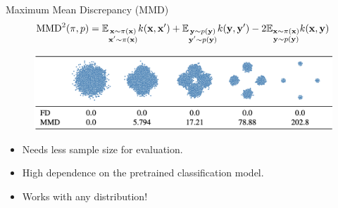 \begin{frame}{Maximum Mean Discrepancy (MMD)}
		\vspace{-0.6cm}
		\[
			\text{MMD}^2(\pi, p) = \mathbb{E}_{\substack{\mathbf{x} \sim\pi(\mathbf{x}) \\ \mathbf{x}' \sim\pi(\mathbf{x})}} k(\mathbf{x}, \mathbf{x}') + \mathbb{E}_{\substack{\mathbf{y} \sim p(\mathbf{y}) \\ \mathbf{y}' \sim p(\mathbf{y})}} k(\mathbf{y}, \mathbf{y}') - 2 \mathbb{E}_{\substack{\mathbf{x} \sim\pi(\mathbf{x}) \\ \mathbf{y} \sim p(\mathbf{y})}} k(\mathbf{x}, \mathbf{y})
		\]
		\vspace{-0.3cm}
	\begin{figure}
		\includegraphics[width=0.95\linewidth]{figs/mmd_normal}
	\end{figure}
	\begin{itemize}
		\item Needs less sample size for evaluation.
		\item High dependence on the pretrained classification model.
		\item Works with any distribution!
	\end{itemize}
\end{frame}
